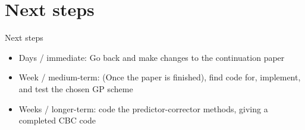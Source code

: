 \documentclass[presentation]{beamer}
\begin{document}
\section{Next steps}
\label{sec:orgfc7ebd5}
\begin{frame}[label={sec:orgc24583a}]{Next steps}
\begin{itemize}
\item Days / immediate: Go back and make changes to the continuation paper
\item Week  / medium-term: (Once the paper is finished), find code for, implement, and test the chosen GP scheme
\item Weeks / longer-term: code the predictor-corrector methods, giving a completed CBC code
\end{itemize}
\end{frame}
\end{document}
